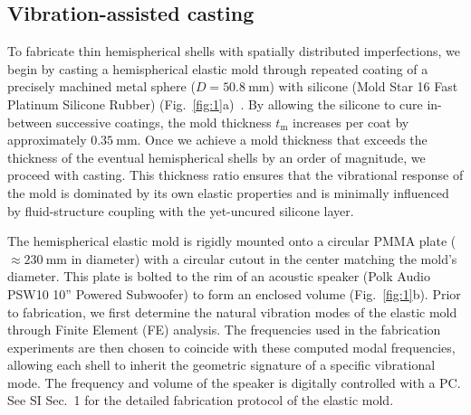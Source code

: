 \documentclass[twocolumn,letter,11pt]{article}
\begin{document}
\subsection*{Vibration-assisted casting}
To fabricate thin hemispherical shells with spatially distributed imperfections, we begin by casting a hemispherical elastic mold through repeated coating of a precisely machined metal sphere ($D=\SI{50.8}{\milli\metre}$) with silicone (Mold Star 16 Fast Platinum Silicone Rubber) (Fig.~\ref{fig:1}a)~\cite{lee2016fabrication}. By allowing the silicone to cure in-between successive coatings, the mold thickness \( t_\mathrm{m} \) increases per coat by approximately $\SI{0.35}{\milli\metre}$. Once we achieve a mold thickness that exceeds the thickness of the eventual hemispherical shells by an order of magnitude, we proceed with casting. This thickness ratio ensures that the vibrational response of the mold is dominated by its own elastic properties and is minimally influenced by fluid-structure coupling with the yet-uncured silicone layer.

The hemispherical elastic mold is rigidly mounted onto a circular PMMA plate ($\approx \SI{230}{\milli\metre}$ in diameter) with a circular cutout in the center matching the mold's diameter. This plate is bolted to the rim of an acoustic speaker (Polk Audio PSW10 10'' Powered Subwoofer) to form an enclosed volume (Fig.~\ref{fig:1}b). Prior to fabrication, we first determine the natural vibration modes of the elastic mold through Finite Element (FE) analysis. The frequencies used in the fabrication experiments are then chosen to coincide with these computed modal frequencies, allowing each shell to inherit the geometric signature of a specific vibrational mode. The frequency and volume of the speaker is digitally controlled with a PC. See SI Sec.~1 for the  detailed fabrication protocol of the elastic mold.
\end{document}
